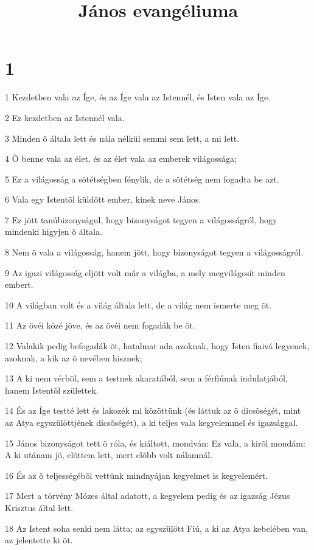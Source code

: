 

\title{János evangéliuma}


\chapter{1}

\par 1 Kezdetben vala az Íge, és az Íge vala az Istennél, és Isten vala az Íge.
\par 2 Ez kezdetben az Istennél vala.
\par 3 Minden õ általa lett és nála nélkül semmi sem lett, a mi lett.
\par 4 Õ benne vala az élet, és az élet vala az emberek világossága;
\par 5 Ez a világosság a sötétségben fénylik, de a sötétség nem fogadta be azt.
\par 6 Vala egy Istentõl küldött ember, kinek neve János.
\par 7 Ez jött tanúbizonyságul, hogy bizonyságot tegyen a világosságról, hogy mindenki higyjen õ általa.
\par 8 Nem õ vala a világosság, hanem jött, hogy bizonyságot tegyen a világosságról.
\par 9 Az igazi világosság eljött volt már a világba, a mely megvilágosít minden embert.
\par 10 A világban volt és a világ általa lett, de a világ nem ismerte meg õt.
\par 11 Az övéi közé jöve, és az övéi nem fogadák be õt.
\par 12 Valakik pedig befogadák õt, hatalmat ada azoknak, hogy Isten fiaivá legyenek, azoknak, a kik az õ nevében hisznek;
\par 13 A ki nem vérbõl, sem a testnek akaratából, sem a férfiúnak indulatjából, hanem Istentõl születtek.
\par 14 És az Íge testté lett és lakozék mi közöttünk (és láttuk az õ dicsõségét, mint az Atya egyszülöttjének dicsõségét), a ki teljes vala kegyelemmel és igazsággal.
\par 15 János bizonyságot tett õ róla, és kiáltott, mondván: Ez vala, a kirõl mondám: A ki utánam jõ, elõttem lett, mert elõbb volt nálamnál.
\par 16 És az õ teljességébõl vettünk mindnyájan kegyelmet is kegyelemért.
\par 17 Mert a törvény Mózes által adatott, a kegyelem pedig és az igazság Jézus Krisztus által lett.
\par 18 Az Istent soha senki nem látta; az egyszülött Fiú, a ki az Atya kebelében van, az jelentette ki õt.
